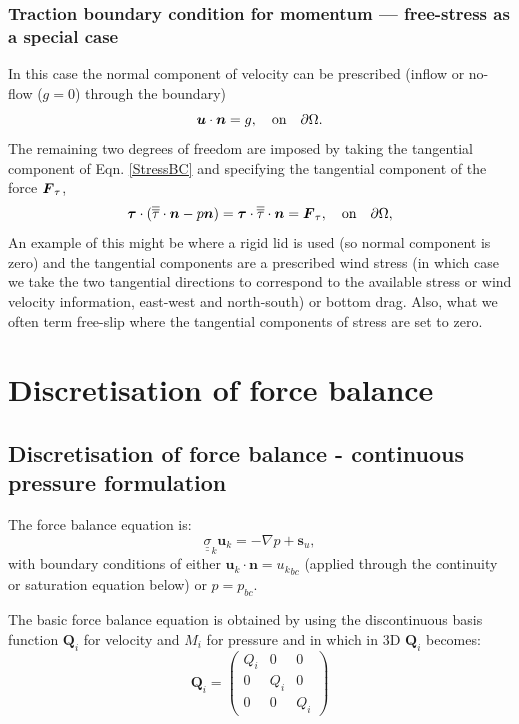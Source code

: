 \subsubsection{Traction boundary condition for momentum --- free-stress as a special case}\label{sect:bc_scalar_traction}
In this case the normal component of velocity can be prescribed (\eg inflow or no-flow ($g=0$) through the boundary)
\begin{equation}
{\mbox{\boldmath$u$}}\cdot{\mbox{\boldmath$n$}} = g,\quad \textrm{on}\quad \partial\Omega.
\end{equation}
The remaining two degrees of freedom are imposed by taking the tangential component of Eqn. \ref{StressBC} and specifying the tangential component of the force ${\mbox{\boldmath$F$}}_{\tau}$, \ie
\begin{equation}
{\mbox{\boldmath$\tau$}}\cdot(\overline{\overline{\tau}}\cdot{\mbox{\boldmath$n$}} - p{\mbox{\boldmath$n$}}) = {\mbox{\boldmath$\tau$}}\cdot\overline{\overline{\tau}}\cdot{\mbox{\boldmath$n$}} = {\mbox{\boldmath$F$}}_{\tau},\quad \textrm{on}\quad \partial\Omega,
\end{equation}
An example of this might be where a rigid lid is used (so normal component is zero) and the tangential components are a prescribed wind stress (in which case we take the two tangential directions to correspond to the available stress or wind velocity information, \ie east-west and north-south) or bottom drag. Also, what we often term free-slip where the tangential components of stress are set to zero.


\section{Discretisation of force balance}


\subsection{Discretisation of force balance - continuous pressure formulation}

The force balance equation is:
\begin{equation}
{\underline {\underline \sigma}}_k {\mathbf u}_k = - \nabla p + {\mathbf s}_u,
\label{force-bal}
\end{equation}
with boundary conditions of either
${{\mathbf u}_k}\cdot {\mathbf n} = {{ u}_k}_{bc}$ (applied through the continuity
or saturation
equation below) or $p = p_{bc}$.

The basic force balance equation is obtained by
using the discontinuous basis function ${\mathbf Q}_i$ for velocity and
$M_i$ for pressure and in which in 3D ${\mathbf Q}_i$ becomes:
\begin{equation}
{\mathbf Q}_i =
  \begin{pmatrix}
    Q_i   & 0 & 0 \\
    0   & Q_i & 0 \\
    0 & 0 & Q_i
  \end{pmatrix}
\label{m_sigma_matrix}
\end{equation}


